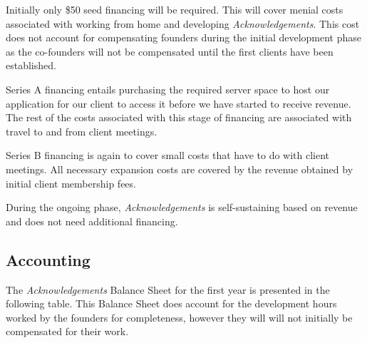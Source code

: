Initially only \$50 seed financing will be required. This will cover menial costs associated with working from home and developing {\it Acknowledgements}. This cost does not account for compensating founders during the initial development phase as the co-founders will not be compensated until the first clients have been established.

Series A financing entails purchasing the required server space to host our application for our client to access it before we have started to receive revenue. The rest of the costs associated with this stage of financing are associated with travel to and from client meetings.

Series B financing is again to cover small costs that have to do with client meetings. All necessary expansion costs are covered by the revenue obtained by initial client membership fees.

During the ongoing phase, {\it Acknowledgements} is self-sustaining based on revenue and does not need additional financing.


\subsection{Accounting}
The {\it Acknowledgements} Balance Sheet for the first year is presented in the following table. This Balance Sheet does account for the development hours worked by the founders for completeness, however they will will not initially be compensated for their work.

